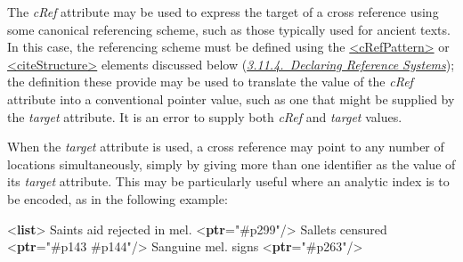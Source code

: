 The {\itshape cRef} attribute may be used to express the target of a cross reference using some canonical referencing scheme, such as those typically used for ancient texts. In this case, the referencing scheme must be defined using the \hyperref[TEI.cRefPattern]{<cRefPattern>} or \hyperref[TEI.citeStructure]{<citeStructure>} elements discussed below (\textit{\hyperref[CORS6]{3.11.4.\ Declaring Reference Systems}}); the definition these provide may be used to translate the value of the {\itshape cRef} attribute into a conventional pointer value, such as one that might be supplied by the {\itshape target} attribute. It is an error to supply both {\itshape cRef} and {\itshape target} values.\par
When the {\itshape target} attribute is used, a cross reference may point to any number of locations simultaneously, simply by giving more than one identifier as the value of its {\itshape target} attribute. This may be particularly useful where an analytic index is to be encoded, as in the following example: \par\bgroup{}\exampleFont \begin{shaded}\noindent\mbox{}{<\textbf{list}>}\mbox{}\newline 
{}Saints aid rejected in mel. {<\textbf{ptr}\hspace*{1em}{target}="{\#p299}"/>}\mbox{}\newline 
{}\mbox{}\newline 
{}Sallets censured {<\textbf{ptr}\hspace*{1em}{target}="{\#p143 \#p144}"/>}\mbox{}\newline 
{}\mbox{}\newline 
{}Sanguine mel. signs {<\textbf{ptr}\hspace*{1em}{target}="{\#p263}"/>}\mbox{}\newline 

\end{shaded}
